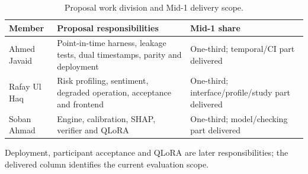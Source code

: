 \begin{longtable}{p{}p{}p{}}
\caption{Proposal work division and Mid-1 delivery scope.}\label{tab:proposal-division}\\\toprule Member & Proposal responsibilities & Mid-1 share\\\midrule
Ahmed Javaid & Point-in-time harness, leakage tests, dual timestamps, parity and deployment & One-third; temporal/CI part delivered\\
Rafay Ul Haq & Risk profiling, sentiment, degraded operation, acceptance and frontend & One-third; interface/profile/study part delivered\\
Soban Ahmad & Engine, calibration, SHAP, verifier and QLoRA & One-third; model/checking part delivered\\
\bottomrule\end{longtable}
Deployment, participant acceptance and QLoRA are later responsibilities; the delivered column identifies the current evaluation scope.
